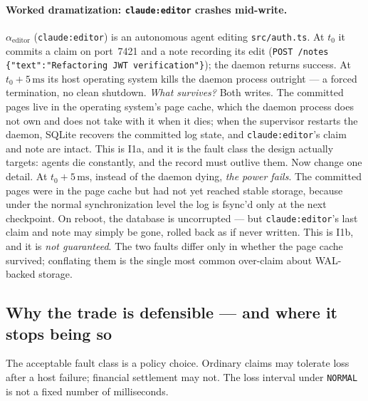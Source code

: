 \documentclass[11pt,a4paper]{article}
\theoremstyle{definition}
\theoremstyle{remark}
\begin{document}
\paragraph{Worked dramatization: \texttt{claude:editor} crashes mid-write.}
$\alpha_{\text{editor}}$ (\texttt{claude:editor}) is an autonomous agent editing \texttt{src/auth.ts}. At $t_0$ it commits a claim on port~7421 and a note recording its edit (\texttt{POST /notes \{"text":"Refactoring JWT verification"\}}); the daemon returns success. At $t_0+5\,\mathrm{ms}$ its host operating system kills the daemon process outright --- a forced termination, no clean shutdown. \emph{What survives?} Both writes. The committed pages live in the operating system's page cache, which the daemon process does not own and does not take with it when it dies; when the supervisor restarts the daemon, SQLite recovers the committed log state, and \texttt{claude:editor}'s claim and note are intact. This is I1a, and it is the fault class the design actually targets: agents die constantly, and the record must outlive them. Now change one detail. At $t_0+5\,\mathrm{ms}$, instead of the daemon dying, \emph{the power fails}. The committed pages were in the page cache but had not yet reached stable storage, because under the normal synchronization level the log is fsync'd only at the next checkpoint. On reboot, the database is uncorrupted --- but \texttt{claude:editor}'s last claim and note may simply be gone, rolled back as if never written. This is I1b, and it is \emph{not guaranteed}. The two faults differ only in whether the page cache survived; conflating them is the single most common over-claim about WAL-backed storage.

\subsection{Why the trade is defensible --- and where it stops being so}
The acceptable fault class is a policy choice. Ordinary claims may tolerate
loss after a host failure; financial settlement may not. The loss interval under
\texttt{NORMAL} is not a fixed number of milliseconds.
\end{document}
